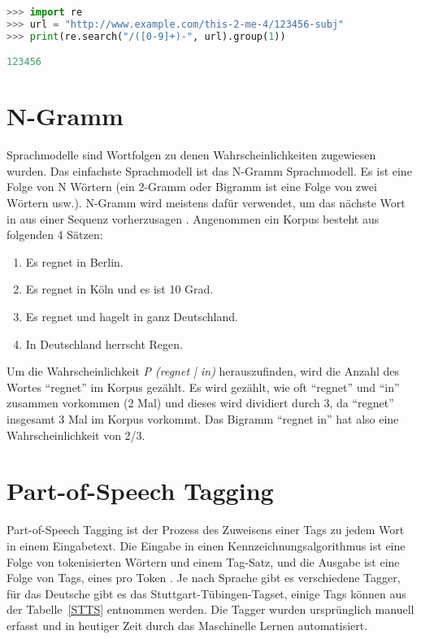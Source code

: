 \begin{lstlisting}[language=Python,caption=Das extrahieren der Zahlen aus einer URL]
>>> import re
>>> url = "http://www.example.com/this-2-me-4/123456-subj"
>>> print(re.search("/([0-9]+)-", url).group(1))

123456
\end{lstlisting}\label{Regex}
\section{N-Gramm}

Sprachmodelle sind Wortfolgen zu denen Wahrscheinlichkeiten zugewiesen wurden. Das einfachste Sprachmodell ist das N-Gramm Sprachmodell. Es ist eine Folge von N Wörtern (ein 2-Gramm oder Bigramm ist eine Folge von zwei Wörtern usw.). N-Gramm wird meistens dafür verwendet, um das nächste Wort in aus einer Sequenz vorherzusagen \cite*[31]{Jurafskya}. Angenommen ein Korpus besteht aus folgenden 4 Sätzen:

\begin{enumerate}
    \item Es regnet in Berlin.
    \item Es regnet in Köln und es ist 10 Grad.
    \item Es regnet und hagelt in ganz Deutschland.
    \item In Deutschland herrscht Regen.
\end{enumerate}

Um die Wahrscheinlichkeit \textit{P (regnet | in)} herauszufinden, wird die Anzahl des Wortes \enquote{regnet} im Korpus gezählt. Es wird gezählt, wie oft \enquote{regnet} und \enquote{in} zusammen vorkommen (2 Mal) und dieses wird dividiert durch 3, da \enquote{regnet} insgesamt 3 Mal im Korpus vorkommt. Das Bigramm \enquote{regnet in} hat also eine Wahrscheinlichkeit von 2/3.

\section{Part-of-Speech Tagging}
Part-of-Speech Tagging ist der Prozess des Zuweisens einer Tags zu jedem Wort in einem Eingabetext. Die Eingabe in einen Kennzeichnungsalgorithmus ist eine Folge von tokenisierten Wörtern und einem Tag-Satz, und die Ausgabe ist eine Folge von Tags, eines pro Token \cite*[148]{Jurafskya}. Je nach Sprache gibt es verschiedene Tagger, für das Deutsche gibt es das Stuttgart-Tübingen-Tagset\cite*{tagger}, einige Tags können aus der Tabelle~\ref{STTS} entnommen werden. Die Tagger wurden ursprünglich manuell erfasst und in heutiger Zeit durch das Maschinelle Lernen automatisiert.



